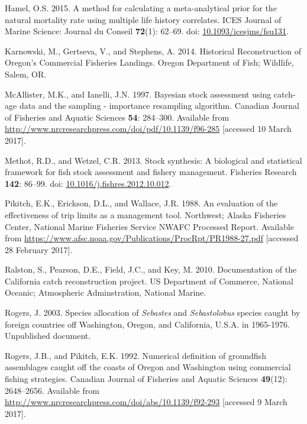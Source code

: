 \documentclass[12pt,]{article}
\begin{document}
\hypertarget{ref-hamel_method_2015}{}
Hamel, O.S. 2015. A method for calculating a meta-analytical prior for
the natural mortality rate using multiple life history correlates. ICES
Journal of Marine Science: Journal du Conseil \textbf{72}(1): 62--69.
doi:
\href{https://doi.org/10.1093/icesjms/fsu131}{10.1093/icesjms/fsu131}.

\hypertarget{ref-karnowski_historical_2014}{}
Karnowski, M., Gertseva, V., and Stephens, A. 2014. Historical
Reconstruction of Oregon's Commercial Fisheries Landings. Oregon
Department of Fish; Wildlife, Salem, OR.

\hypertarget{ref-mcallister_bayesian_1997}{}
McAllister, M.K., and Ianelli, J.N. 1997. Bayesian stock assessment
using catch-age data and the sampling - importance resampling algorithm.
Canadian Journal of Fisheries and Aquatic Sciences \textbf{54}:
284--300. Available from
\url{http://www.nrcresearchpress.com/doi/pdf/10.1139/f96-285}
{[}accessed 10 March 2017{]}.

\hypertarget{ref-methot_stock_2013}{}
Methot, R.D., and Wetzel, C.R. 2013. Stock synthesis: A biological and
statistical framework for fish stock assessment and fishery management.
Fisheries Research \textbf{142}: 86--99. doi:
\href{https://doi.org/10.1016/j.fishres.2012.10.012}{10.1016/j.fishres.2012.10.012}.

\hypertarget{ref-pikitch_evaluation_1988}{}
Pikitch, E.K., Erickson, D.L., and Wallace, J.R. 1988. An evaluation of
the effectiveness of trip limits as a management tool. Northwest; Alaska
Fisheries Center, National Marine Fisheries Service NWAFC Processed
Report. Available from
\url{https://www.afsc.noaa.gov/Publications/ProcRpt/PR1988-27.pdf}
{[}accessed 28 February 2017{]}.

\hypertarget{ref-ralston_documentation_2010}{}
Ralston, S., Pearson, D.E., Field, J.C., and Key, M. 2010. Documentation
of the California catch reconstruction project. US Department of
Commerce, National Oceanic; Atmospheric Adminstration, National Marine.

\hypertarget{ref-rogers_species_2003}{}
Rogers, J. 2003. Species allocation of \emph{Sebastes} and
\emph{Sebastolobus} species caught by foreign countries off Washington,
Oregon, and California, U.S.A. in 1965-1976. Unpublished document.

\hypertarget{ref-rogers_numerical_1992}{}
Rogers, J.B., and Pikitch, E.K. 1992. Numerical definition of groundfish
assemblages caught off the coasts of Oregon and Washington using
commercial fishing strategies. Canadian Journal of Fisheries and Aquatic
Sciences \textbf{49}(12): 2648--2656. Available from
\url{http://www.nrcresearchpress.com/doi/abs/10.1139/f92-293}
{[}accessed 9 March 2017{]}.
\end{document}
